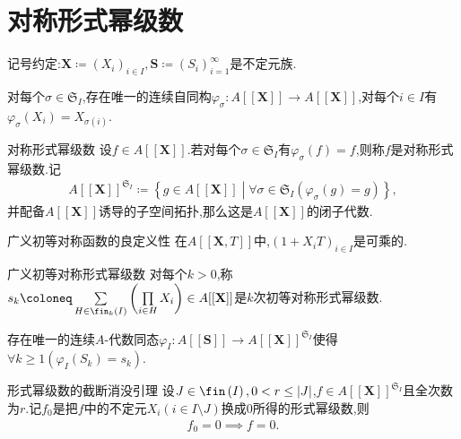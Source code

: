 \section{对称形式幂级数}

记号约定:$\mathbf{X}\coloneq (X_{i})_{i\in I},\mathbf{S}\coloneq\left(S_{i}\right)_{i=1}^{\infty}$是不定元族.

\begin{proposition}{}{}
	对每个$\sigma\in\mathfrak{S}_{I}$,存在唯一的连续自同构$\varphi_{\sigma}:A[[\mathbf{X}]]\to A[[\mathbf{X}]]$,对每个$i\in I$有$\varphi_{\sigma}\left(X_{i}\right)=X_{\sigma\left(i\right)}$.
\end{proposition}

\begin{definition}{对称形式幂级数}{}
	设$f\in A[[\mathbf{X}]]$.若对每个$\sigma\in\mathfrak{S}_{I}$有$\varphi_{\sigma}\left(f\right)=f$,则称$f$是对称形式幂级数.记
	\begin{align*}
		A[[\mathbf{X}]]^{\mathfrak{S}_{I}}\coloneq\left\{g\in A[[\mathbf{X}]]\middle|\forall\sigma\in\mathfrak{S}_{I}\left(\varphi_{\sigma}\left(g\right)=g\right)\right\},
	\end{align*}
	并配备$A[[\mathbf{X}]]$诱导的子空间拓扑,那么这是$A[[\mathbf{X}]]$的闭子代数.
\end{definition}

\begin{lemma}{广义初等对称函数的良定义性}{}
	在$A[[\mathbf{X},T]]$中,$\left(1+X_{i}T\right)_{i\in I}$是可乘的.
\end{lemma}

\begin{definition}{广义初等对称形式幂级数}{}
	对每个$k>0$,称$s_{k}\coloneq\sum\limits_{H\in\fin_{k}\left(I\right)}\left(\prod\limits_{i\in H}X_{i}\right)\in A[[\mathbf{X}]]$是$k$次初等对称形式幂级数.
\end{definition}

\begin{proposition}{}{}
	存在唯一的连续$A$-代数同态$\varphi_{I}:A[[\mathbf{S}]]\to A[[\mathbf{X}]]^{\mathfrak{S}_{I}}$使得$\forall k\geq 1\left(\varphi_{I}\left(S_{k}\right)=s_{k}\right)$.
\end{proposition}

\begin{lemma}{形式幂级数的截断消没引理}{}
	设$J\in\fin\left(I\right),0<r\leq\left|J\right|$,$f\in A[[\mathbf{X}]]^{\mathfrak{S}_{I}}$且全次数为$r$.记$f_{0}$是把$f$中的不定元$X_{i}\left(i\in I\setminus J\right)$换成$0$所得的形式幂级数,则
	\begin{align*}
		f_{0}=0\implies f=0.
	\end{align*}
\end{lemma}

